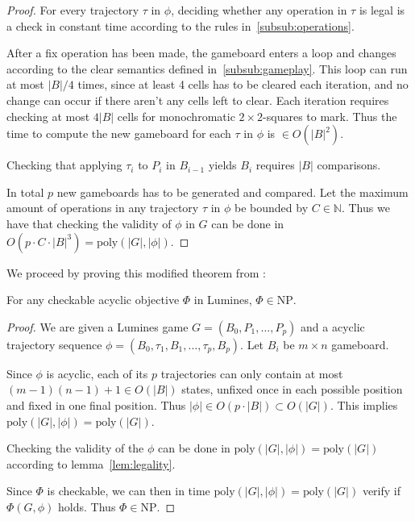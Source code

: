 \begin{proof}
For every trajectory $\tau$ in $\phi$, deciding whether any operation in $\tau$ is legal is a check in constant time according to the rules in~\ref{subsub:operations}.

After a fix operation has been made, the gameboard enters a loop and changes according to the clear semantics defined in~\ref{subsub:gameplay}. This loop can run at most $|B| / 4$ times, since at least 4 cells has to be cleared each iteration, and no change can occur if there aren't any cells left to clear. Each iteration requires checking at most $4|B|$ cells for monochromatic $2 \times 2$-squares to mark. Thus the time to compute the new gameboard for each $\tau$ in $\phi$ is $\in O(|B|^2)$.

Checking that applying $\tau_i$ to $P_i$ in $B_{i-1}$ yields $B_i$ requires $|B|$ comparisons. 

In total $p$ new gameboards has to be generated and compared. Let the maximum amount of operations in any trajectory $\tau$ in $\phi$ be bounded by $C \in \mathbb{N}$. Thus we have that checking the validity of $\phi$ in $G$ can be done in $O(p \cdot C \cdot |B|^3) = \text{poly}(|G|, |\phi|)$. 
\end{proof}

We proceed by proving this modified theorem from \cite{tetris}: \\

\begin{thm}
\label{thm:npobj}
For any checkable acyclic objective $\Phi$ in Lumines, $\Phi \in \text{NP}$.
\end{thm}

\begin{proof}
We are given a Lumines game $G = (B_0, P_1, \ldots, P_p)$ and a acyclic trajectory sequence $\phi = (B_0, \tau_1, B_1, \ldots ,\tau_p, B_p)$. Let $B_i$ be $m \times n$ gameboard.

Since $\phi$ is acyclic, each of its $p$ trajectories can only contain at most $(m-1)(n-1) + 1 \in O(|B|)$ states, unfixed once in each possible position and fixed in one final position. Thus $|\phi| \in O(p \cdot |B|) \subset O(|G|)$. This implies $\text{poly}(|G|, |\phi|) = \text{poly}(|G|)$.

Checking the validity of the $\phi$ can be done in $\text{poly}(|G|, |\phi|) = \text{poly}(|G|)$ according to lemma~\ref{lem:legality}.

Since $\Phi$ is checkable, we can then in time $\text{poly}(|G|, |\phi|) = \text{poly}(|G|)$ verify if $\Phi(G, \phi)$ holds. Thus $\Phi \in \text{NP}$.
\end{proof}

